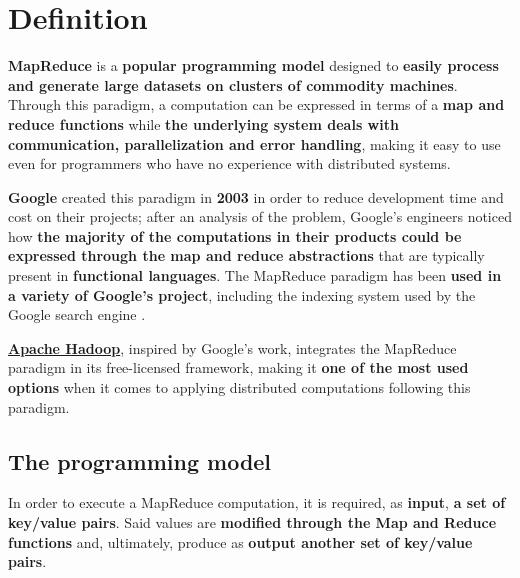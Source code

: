 \section{Definition}
\textbf{MapReduce} is a \textbf{popular programming model} designed to \textbf{easily process and generate large datasets on clusters of commodity machines}. Through this paradigm, a computation can be expressed in terms of a \textbf{map and reduce functions} while \textbf{the underlying system deals with communication, parallelization and error handling}, making it easy to use even for programmers who have no experience with distributed systems.

\textbf{Google} created this paradigm in \textbf{2003} in order to reduce development time and cost on their projects; after an analysis of the problem, Google's engineers noticed how \textbf{the majority of the computations in their products could be expressed through the map and reduce abstractions} that are typically present in \textbf{functional languages}. The MapReduce paradigm has been \textbf{used in a variety of Google's project}, including the indexing system used by the Google search engine \cite{google_mapreduce}.

\textbf{\href{https://hadoop.apache.org/}{Apache Hadoop}}, inspired by Google's work, integrates the MapReduce paradigm in its free-licensed framework, making it \textbf{one of the most used options} when it comes to applying distributed computations following this paradigm.

\subsection{The programming model}
In order to execute a MapReduce computation, it is required, as \textbf{input}, \textbf{a set of key/value pairs}. Said values are \textbf{modified through the Map and Reduce functions} and, ultimately, produce as \textbf{output another set of key/value pairs}. 

